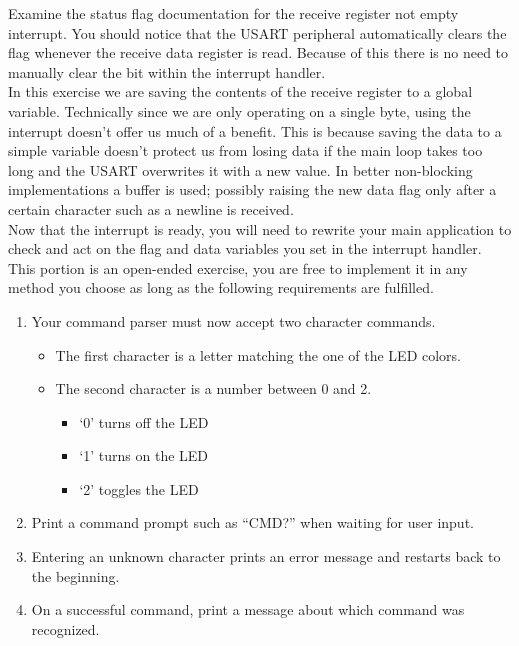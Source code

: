 \documentclass[11pt,fleqn]{book} %
\begin{document}
Examine the status flag documentation for the receive register not empty interrupt. You should notice that the USART peripheral automatically clears the flag whenever the receive data register is read. Because of this there is no need to manually clear the bit within the interrupt handler. \\

In this exercise we are saving the contents of the receive register to a global variable. Technically since we are only operating on a single byte, using the interrupt doesn't offer us much of a benefit. This is because saving the data to a simple variable doesn't protect us from losing data if the main loop takes too long and the USART overwrites it with a new value. In better non-blocking implementations a buffer is used; possibly raising the new data flag only after a certain character such as a newline is received.\\

Now that the interrupt is ready, you will need to rewrite your main application to check and act on the flag and data variables you set in the interrupt handler. This portion is an open-ended exercise, you are free to implement it in any method you choose as long as the following requirements are fulfilled. 



\begin{enumerate}
    \item Your command parser must now accept two character commands.
    \begin{itemize}
        \item The first character is a letter matching the one of the LED colors.
        \item The second character is a number between 0 and 2. 
        \begin{itemize}
            \item `0' turns off the LED
            \item `1' turns on the LED
            \item `2' toggles the LED
        \end{itemize}
    \end{itemize}
    \item Print a command prompt such as ``CMD?'' when waiting for user input.
    \item Entering an unknown character prints an error message and restarts back to the beginning.
    \item On a successful command, print a message about which command was recognized. 
\end{enumerate}
\end{document}
